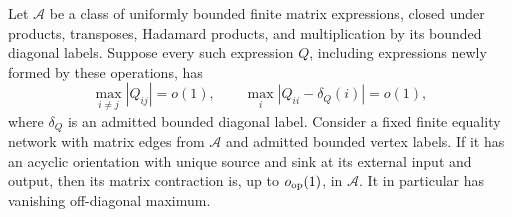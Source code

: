 \begin{lemma}
\label{lem:path-directed-network}
Let $\mathcal A$ be a class of uniformly bounded finite matrix
expressions, closed under products, transposes, Hadamard products,
and multiplication by its bounded diagonal labels.  Suppose every
such expression $Q$, including expressions newly formed by these
operations, has
\[
 \max_{i\ne j}|Q_{ij}|=o(1),\qquad
 \max_i|Q_{ii}-\delta_Q(i)|=o(1),
\]
where $\delta_Q$ is an admitted bounded diagonal label.  Consider
a fixed finite equality network with matrix edges from $\mathcal A$
and admitted bounded vertex labels.  If it has an acyclic orientation with
unique source and sink at its external input and output, then its
matrix contraction is, up to $o_{\mathrm{op}}(1)$, in $\mathcal A$.
It in particular has vanishing off-diagonal maximum.
\end{lemma}

